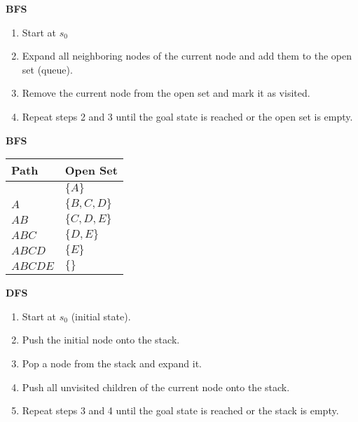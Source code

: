 \begin{example}
    
\end{example}
\newpage

\begin{example}
\end{example}

\begin{process} \textbf{BFS}
    \begin{enumerate}
        \item Start at $s_0$ 
        \item Expand all neighboring nodes of the current node and add them to the open set (queue).
        \item Remove the current node from the open set and mark it as visited.
        \item Repeat steps 2 and 3 until the goal state is reached or the open set is empty.
    \end{enumerate}
\end{process}

\begin{example} \textbf{BFS}
    \begin{center}
        \begin{tabular}{ll}
        \toprule
        \textbf{Path} & \textbf{Open Set} \\
        \midrule
         & $\{A\}$ \\
        $A$ & $\{B, C, D\}$ \\
        $AB$ & $\{C, D, E\}$ \\
        $ABC$ & $\{D, E\}$ \\
        $ABCD$ & $\{E\}$ \\
        $ABCDE$ & $\{\}$ \\
        \bottomrule
        \end{tabular}
    \end{center}
\end{example}

\begin{process} \textbf{DFS}
    \begin{enumerate}
        \item Start at $s_0$ (initial state).
        \item Push the initial node onto the stack.
        \item Pop a node from the stack and expand it.
        \item Push all unvisited children of the current node onto the stack.
        \item Repeat steps 3 and 4 until the goal state is reached or the stack is empty.
    \end{enumerate}
\end{process}

